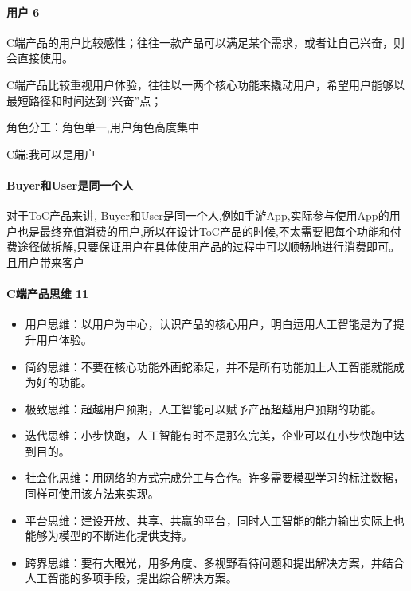 \documentclass[letterpaper,10pt,english]{sphinxmanual}
\begin{document}
\paragraph{用户 6\sphinxfootnotemark[105]}
\label{\detokenize{chapter_introduction/2C:id6}}%
\begin{footnotetext}[105]\sphinxAtStartFootnote
{}
%
\end{footnotetext}\ignorespaces 
C端产品的用户比较感性；往往一款产品可以满足某个需求，或者让自己兴奋，则会直接使用。

C端产品比较重视用户体验，往往以一两个核心功能来撬动用户，希望用户能够以最短路径和时间达到“兴奋”点；

角色分工：角色单一,用户角色高度集中

C端:我可以是用户


\paragraph{Buyer和User是同一个人}
\label{\detokenize{chapter_introduction/2C:buyeruser}}
对于ToC产品来讲,
Buyer和User是同一个人,例如手游App,实际参与使用App的用户也是最终充值消费的用户,所以在设计ToC产品的时候,不太需要把每个功能和付费途径做拆解,只要保证用户在具体使用产品的过程中可以顺畅地进行消费即可。且用户带来客户


\paragraph{C端产品思维 11\sphinxfootnotemark[106]}
\label{\detokenize{chapter_introduction/2C:c-11}}%
\begin{footnotetext}[106]\sphinxAtStartFootnote
{}
%
\end{footnotetext}\ignorespaces \begin{itemize}
\item {} 
用户思维：以用户为中心，认识产品的核心用户，明白运用人工智能是为了提升用户体验。

\item {} 
简约思维：不要在核心功能外画蛇添足，并不是所有功能加上人工智能就能成为好的功能。

\item {} 
极致思维：超越用户预期，人工智能可以赋予产品超越用户预期的功能。

\item {} 
迭代思维：小步快跑，人工智能有时不是那么完美，企业可以在小步快跑中达到目的。

\item {} 
社会化思维：用网络的方式完成分工与合作。许多需要模型学习的标注数据，同样可使用该方法来实现。

\item {} 
平台思维：建设开放、共享、共赢的平台，同时人工智能的能力输出实际上也能够为模型的不断进化提供支持。

\item {} 
跨界思维：要有大眼光，用多角度、多视野看待问题和提出解决方案，并结合人工智能的多项手段，提出综合解决方案。

\end{itemize}
\end{document}
